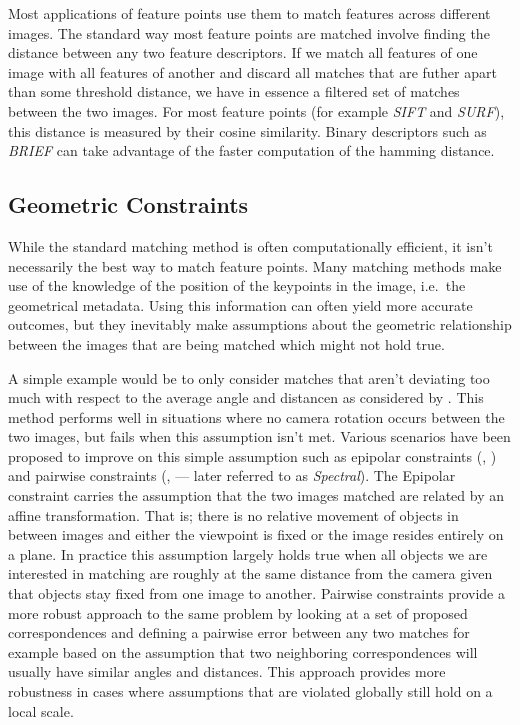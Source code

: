 Most applications of feature points use them to match features across 
different images. The standard way most feature points are matched 
involve finding the distance between any two feature descriptors. If we 
match all features of one image with all features of another and discard 
all matches that are futher apart than some threshold distance, we have 
in essence a filtered set of matches between the two images. For most 
feature points (for example \emph{SIFT} and \emph{SURF}), this distance 
is measured by their cosine similarity. Binary descriptors such
as \emph{BRIEF} can take advantage of the faster computation of the 
hamming distance.

\subsection{Geometric Constraints}

While the standard matching method is often computationally efficient, 
it isn't necessarily the best way to match feature points. Many matching 
methods make use of the knowledge of the position of the keypoints in 
the image, i.e.\ the geometrical metadata. Using this information can 
often yield more accurate outcomes, but they inevitably make assumptions
about the geometric relationship between the images that are being 
matched which might not hold true.  

A simple example would be to only consider matches that aren't deviating 
too much with respect to the average angle and distancen as considered 
by \cite{kim2008efficient}.  This method performs well in situations 
where no camera rotation occurs between the two images, but fails when 
this assumption isn't met. Various scenarios have been proposed to 
improve on this simple assumption such as epipolar constraints 
(\cite{torr2000mlesac}, \cite{chum2005matching}) and pairwise 
constraints (\cite{choi2009robust}, \cite{leordeanu2005spectral} --- 
later referred to as \emph{Spectral}).  The Epipolar constraint carries 
the assumption that the two images matched are related by an affine 
transformation.  That is; there is no relative movement of objects in 
between images and either the viewpoint is fixed or the image resides 
entirely on a plane.  In practice this assumption largely holds true 
when all objects we are interested in matching are roughly at the same 
distance from the camera given that objects stay fixed from one image to 
another.  Pairwise constraints provide a more robust approach to the 
same problem by looking at a set of proposed correspondences and 
defining a pairwise error between any two matches for example based on 
the assumption that two neighboring correspondences will usually have 
similar angles and distances. This approach provides more robustness in 
cases where assumptions that are violated globally still hold on a local 
scale.

